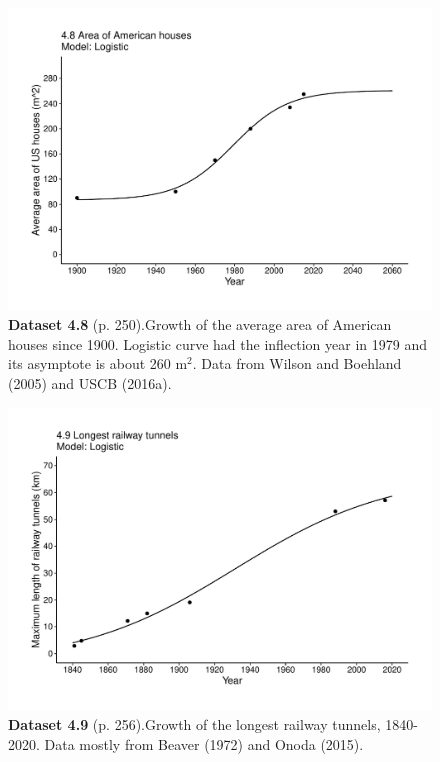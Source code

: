 \documentclass[aps,rmp,preprint,superscriptaddress,10pt,onecolumn]{article}
\begin{document}
\clearpage
\begin{figure}[h]
\includegraphics[width=\textwidth]{output/figs-ggplot/4.8.pdf}
\caption*{\textbf{Dataset 4.8} (p. 250).Growth of the average area of American houses since 1900. Logistic curve had the inflection year in 1979 and its asymptote is about 260 m$^2$. Data from Wilson and Boehland (2005) and USCB (2016a).}
\end{figure}
	
\clearpage
\begin{figure}[h]
\includegraphics[width=\textwidth]{output/figs-ggplot/4.9.pdf}
\caption*{\textbf{Dataset 4.9} (p. 256).Growth of the longest railway tunnels, 1840-2020. Data mostly from Beaver (1972) and Onoda (2015).}
\end{figure}
	
\end{document}
